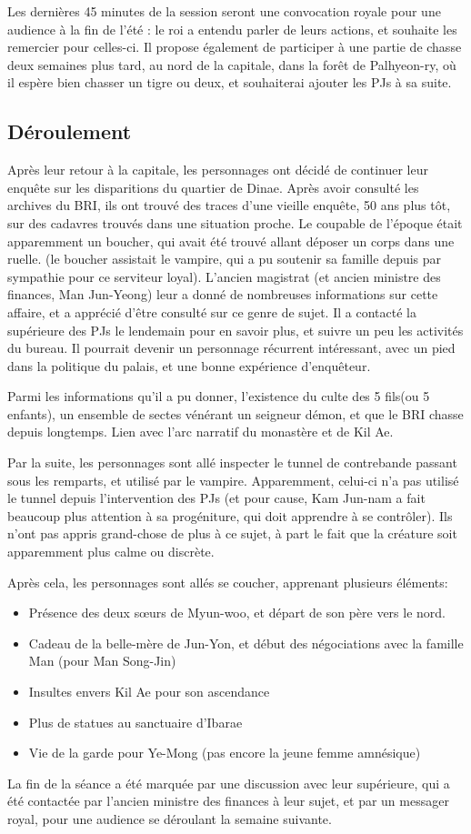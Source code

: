 \documentclass[10pt,a4paper]{book}
\begin{document}
Les dernières 45 minutes de la session seront une convocation royale pour une audience à la fin de l'été : le roi a entendu parler de leurs actions, et souhaite les remercier pour celles-ci. Il propose également de participer à une partie de chasse deux semaines plus tard, au nord de la capitale, dans la forêt de Palhyeon-ry, où il espère bien chasser un tigre ou deux, et souhaiterai ajouter les PJs à sa suite.
\subsection{Déroulement}
Après leur retour à la capitale, les personnages ont décidé de continuer leur enquête sur les disparitions du quartier de Dinae. Après avoir consulté les archives du BRI, ils ont trouvé des traces d'une vieille enquête, 50 ans plus tôt, sur des cadavres trouvés dans une situation proche. Le coupable de l'époque était apparemment un boucher, qui avait été trouvé allant déposer un corps dans une ruelle. (le boucher assistait le vampire, qui a pu soutenir sa famille depuis par sympathie pour ce serviteur loyal). L'ancien magistrat (et ancien ministre des finances, Man Jun-Yeong) leur a donné de nombreuses informations sur cette affaire, et a apprécié d'être consulté sur ce genre de sujet. Il a contacté la supérieure des PJs le lendemain pour en savoir plus, et suivre un peu les activités du bureau. Il pourrait devenir un personnage récurrent intéressant, avec un pied dans la politique du palais, et une bonne expérience d'enquêteur.

Parmi les informations qu'il a pu donner, l'existence du culte des 5 fils(ou 5 enfants), un ensemble de sectes vénérant un seigneur démon, et que le BRI chasse depuis longtemps. Lien avec l'arc narratif du monastère et de Kil Ae.

Par la suite, les personnages sont allé inspecter le tunnel de contrebande passant sous les remparts, et utilisé par le vampire. Apparemment, celui-ci n'a pas utilisé le tunnel depuis l'intervention des PJs (et pour cause, Kam Jun-nam a fait beaucoup plus attention à sa progéniture, qui doit apprendre à se contrôler). Ils n'ont pas appris grand-chose de plus à ce sujet, à part le fait que la créature soit apparemment plus calme ou discrète.

Après cela, les personnages sont allés se coucher, apprenant plusieurs éléments:
\begin{itemize}
\item Présence des deux sœurs de Myun-woo, et départ de son père vers le nord.
\item Cadeau de la belle-mère de Jun-Yon, et début des négociations avec la famille Man (pour Man Song-Jin)
\item Insultes envers Kil Ae pour son ascendance
\item Plus de statues au sanctuaire d'Ibarae
\item Vie de la garde pour Ye-Mong (pas encore la jeune femme amnésique)
\end{itemize}
La fin de la séance a été marquée par une discussion avec leur supérieure, qui a été contactée par l'ancien ministre des finances à leur sujet, et par un messager royal, pour une audience se déroulant la semaine suivante.
\end{document}
